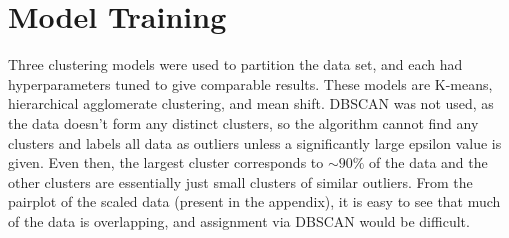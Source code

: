 \documentclass[12pt]{article}
\begin{document}
\section*{Model Training}


Three clustering models were used to partition the data set, and each had hyperparameters tuned to give comparable results. These models are K-means, hierarchical agglomerate clustering, and mean shift. DBSCAN was not used, as the data doesn't form any distinct clusters, so the algorithm cannot find any clusters and labels all data as outliers unless a significantly large epsilon value is given. Even then, the largest cluster corresponds to $\sim90\%$ of the data and the other clusters are essentially just small clusters of similar outliers. From the pairplot of the scaled data (present in the appendix), it is easy to see that much of the data is overlapping, and assignment via DBSCAN would be difficult.
\end{document}

